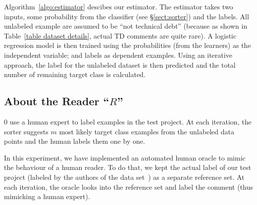 \documentclass[10pt,conference]{IEEEtran}
\newcommand{\tion}[1]{\S\ref{sect:#1}}
\begin{document}
  
 Algorithm~\ref{algo:estimator} descibes our estimator.
 The estimator takes two inputs, some probability from
 the classifier (see \tion{sorter})
 and the labels. All unlabeled example are assumed to be ``not technical debt'' (because as shown in Table~\ref{table dataset details}, actual TD comments are quite rare). A logistic regression model is then  trained using the probabilities (from the learners) as
 the  independent variable; and labels as dependent examples. Using an iterative approach, the label for the unlabeled dataset is then predicted and the total number of remaining target class is calculated. 






\subsection{About the Reader ``$R$'' }
{\IT}0 use a human expert to label examples in the test project. At each iteration, the sorter suggests $m$ most likely target class examples from the unlabeled data points and the human labels them one by one. 

In this experiment, we have implemented an automated human oracle to mimic the behaviour of a human reader. To do that, we kept the actual label of our test project (labeled by the authors of the data set~\cite{maldonado2015detecting}) as a separate reference set. At each iteration, the oracle looks into the reference set and label the comment (thus mimicking a human expert).



\end{document}
